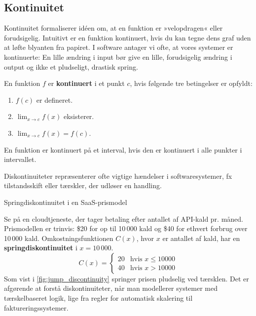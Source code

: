 \subsection*{Kontinuitet}
Kontinuitet formaliserer idéen om, at en funktion er »velopdragen« eller forudsigelig. Intuitivt er en funktion kontinuert, hvis du kan tegne dens graf uden at løfte blyanten fra papiret. I software antager vi ofte, at vores systemer er kontinuerte: En lille ændring i input bør give en lille, forudsigelig ændring i output og ikke et pludseligt, drastisk spring.

\begin{definition}[Kontinuitet]
En funktion \( f \) er \textbf{kontinuert} i et punkt \( c \), hvis følgende tre betingelser er opfyldt:
\begin{enumerate}
    \item \( f(c) \) er defineret.
    \item \( \lim_{x \to c} f(x) \) eksisterer.
    \item \( \lim_{x \to c} f(x) = f(c) \).
\end{enumerate}
En funktion er kontinuert på et interval, hvis den er kontinuert i alle punkter i intervallet.
\end{definition}

Diskontinuiteter repræsenterer ofte vigtige hændelser i softwaresystemer, fx tilstandsskift eller tærskler, der udløser en handling.

\begin{example} Springdiskontinuitet i en SaaS-prismodel
    
Se på en cloudtjeneste, der tager betaling efter antallet af API-kald pr. måned. Prismodellen er trinvis: \$20 for op til 10\,000 kald og \$40 for ethvert forbrug over 10\,000 kald. Omkostningsfunktionen \(C(x)\), hvor \(x\) er antallet af kald, har en \textbf{springdiskontinuitet} i \(x = 10\,000\).
\[
C(x) =
\begin{cases}
    20 & \text{hvis } x \le 10000 \\
    40 & \text{hvis } x > 10000
\end{cases}
\]
Som vist i \autoref{fig:jump_discontinuity} springer prisen pludselig ved tærsklen. Det er afgørende at forstå diskontinuiteter, når man modellerer systemer med tærskelbaseret logik, lige fra regler for automatisk skalering til faktureringssystemer.
\end{example}

